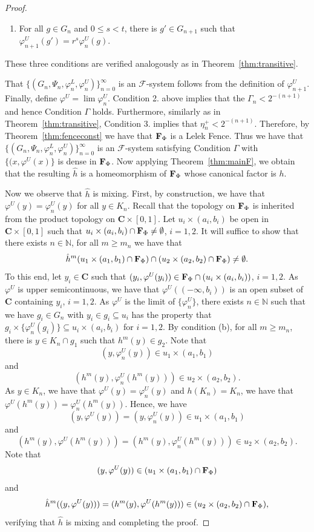 \documentclass[11pt]{amsart}
\newcommand{\N}{\mathbb{N}}  %
\newcommand{\oa}{\overrightarrow}
\newcommand{\cantor}{\mathbf C}
\newcommand{\fence}{{\bf F}_{\Phi}{}}
\newcommand{\cF}{\mathcal{F}}
\newcommand{\fsystem}{\{(G_n, \Psi_n,\varphi^L_n,\varphi^U_n)\}_{n=0}^{\infty}}
\begin{document}
{\begin{proof}
\begin{enumerate}
        \item For all $g \in G_n$ and $ 0\le s < t$, there is $g' \in G_{n+1}$ such that $\varphi^U_{n+1} (g')=r^s\varphi^U_n(g)$.
        
    \end{enumerate}

These three conditions are verified analogously as in Theorem~\ref{thm:transitive}.    

That $\fsystem$ is an $\cF$-system follows from the definition of $\varphi^U_{n+1}$. 
Finally, define $\varphi^U = \lim \varphi^U_n$. Condition 2. above implies that the $\Gamma_n < 2^{-(n+1)}$ and hence  Condition $\Gamma$ holds. Furthermore, similarly as in Theorem~\ref{thm:transitive}, Condition 3. implies that $\eta^+_n < 2^{-(n+1)}$. Therefore, by Theorem~\ref{thm:fenceconst} we have that $\fence$ is a Lelek Fence. Thus we have that  $\fsystem$ is an $\cF$-system satisfying Condition $\Gamma$ with $\{(x, \varphi^U(x)\}$ is dense in $\fence$.
Now applying Theorem~\ref{thm:mainF}, we obtain that the resulting $\hat{h}$ is a homeomorphism of $\fence$ whose canonical factor is $h$. 

Now we observe that $\hat h$ is mixing. First, by construction, we have that $\varphi ^U(y) = \varphi^U_n (y)$ for all $y \in K_n$. Recall that the topology on $\fence$ is inherited from the product topology on $\cantor \times [0,1]$. Let $u_i \times (a_i,b_i)$ be open in  $\cantor \times [0,1]$ such that $ u_i \times (a_i,b_i) \cap \fence  \neq \emptyset$, $i=1,2$. It will suffice to show that there exists $n \in \N$, for  all  $m \ge m_n$ we have that 
\[
\hat{h}^{m} (u_1 \times (a_1,b_1) \cap \fence) \cap (u_2 \times (a_2,b_2) \cap \fence)  \neq \emptyset.
\]
To this end, let  $y_i \in \cantor$ such that $(y_i, \varphi^U(y_i)) \in \fence\cap (u_i \times (a_i,b_i))$, $i=1,2$. As $\varphi^U$ is upper semicontinuous, we have that $\varphi^U ((-\infty, b_i))$ is an open subset of $\cantor$ containing $y_i$, $i=1,2$. As $\varphi^U$ is the limit of $\{\varphi^U_n\}$, there exists $n\in \N$ such that  we have $g_i \in G_n$ with $y_i \in g_i \subseteq u_i$ has the property that $g_i \times \{\varphi^U_n(g_i)\} \subseteq u_i \times (a_i,b_i)$ for $i=1,2$. By condition (b), for all  $m \ge m_n$, there is $y\in K_n \cap g_1$ such that  $h^m(y) \in g_2$. Note that 
\[(y, \varphi^U_n(y)) \in u_1 \times (a_1,b_1) 
\]
and 
\[(h^m(y), \varphi^U_n(h^m(y))) \in u_2 \times (a_2,b_2).
\]
As $y \in K_n$, we have that $\varphi^U(y) =\varphi^U_n(y)$ and $h(K_n) =K_n$, we have that $\varphi^U(h^m(y)) =\varphi^U_n(h^m(y))$. Hence, we have 
\[ (y, \varphi^U(y)) = (y, \varphi^U_n(y)) \in u_1 \times (a_1,b_1) \]
and \[ (h^m(y), \varphi^U(h^m(y))) = (h^m(y), \varphi^U_n(h^m(y))) \in u_2 \times (a_2,b_2). \]  Note that \[(y, \varphi^U(y)) \in (u_1 \times (a_1,b_1) \cap \fence) 
\]
and  
\[\hat{h}^m ((y, \varphi^U(y))) = (h^m(y), \varphi^U(h^m(y)))  \in (u_2 \times (a_2,b_2) \cap \fence),
\]
verifying that $\hat{h}$ is mixing and completing the proof.
\end{proof}

}
\end{document}
